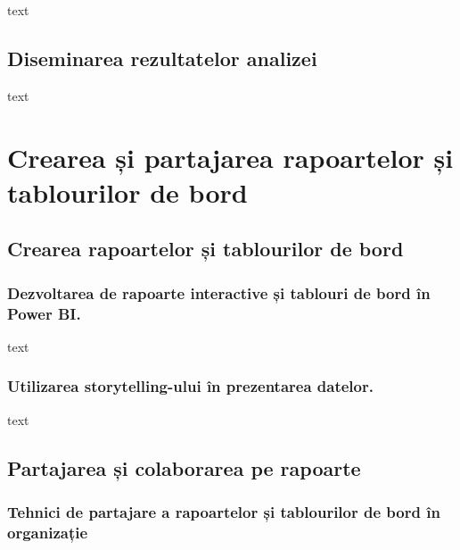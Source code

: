 \documentclass[
  11pt,
  b5paper,
  nottoc]{book}
\begin{document}
text

\hypertarget{diseminarea-rezultatelor-analizei}{%
\section{Diseminarea rezultatelor
analizei}\label{diseminarea-rezultatelor-analizei}}

text


\hypertarget{cap8}{%
\chapter{Crearea și partajarea rapoartelor și tablourilor de
bord}\label{cap8}}

\hypertarget{crearea-rapoartelor-ux219i-tablourilor-de-bord}{%
\section{Crearea rapoartelor și tablourilor de
bord}\label{crearea-rapoartelor-ux219i-tablourilor-de-bord}}

\hypertarget{dezvoltarea-de-rapoarte-interactive-ux219i-tablouri-de-bord-uxeen-power-bi.}{%
\subsection{Dezvoltarea de rapoarte interactive și tablouri de bord în
Power
BI.}\label{dezvoltarea-de-rapoarte-interactive-ux219i-tablouri-de-bord-uxeen-power-bi.}}

text

\hypertarget{utilizarea-storytelling-ului-uxeen-prezentarea-datelor.}{%
\subsection{Utilizarea storytelling-ului în prezentarea
datelor.}\label{utilizarea-storytelling-ului-uxeen-prezentarea-datelor.}}

text

\hypertarget{partajarea-ux219i-colaborarea-pe-rapoarte}{%
\section{Partajarea și colaborarea pe
rapoarte}\label{partajarea-ux219i-colaborarea-pe-rapoarte}}

\hypertarget{tehnici-de-partajare-a-rapoartelor-ux219i-tablourilor-de-bord-uxeen-organizaux21bie}{%
\subsection{Tehnici de partajare a rapoartelor și tablourilor de bord în
organizație}\label{tehnici-de-partajare-a-rapoartelor-ux219i-tablourilor-de-bord-uxeen-organizaux21bie}}
\end{document}
